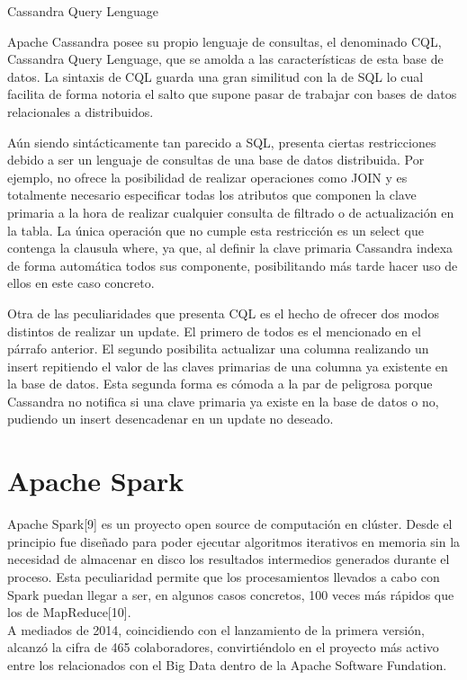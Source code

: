 Cassandra Query Lenguage

Apache Cassandra posee su propio lenguaje de consultas, el denominado CQL, Cassandra Query Lenguage, que se amolda a las características de esta base de datos. La sintaxis de CQL guarda una gran similitud con la de SQL lo cual facilita de forma notoria el salto que supone pasar de trabajar con bases de datos relacionales a distribuidos. 

Aún siendo sintácticamente  tan parecido a SQL, presenta ciertas restricciones debido a ser un lenguaje de consultas de una base de datos distribuida. Por ejemplo, no ofrece la posibilidad de realizar operaciones como JOIN y es totalmente necesario especificar todas los atributos que componen la clave primaria a la hora de realizar cualquier consulta de filtrado o de actualización en la tabla. La única operación que no cumple esta restricción es un select que contenga la clausula where, ya que, al definir la clave primaria Cassandra indexa de forma automática todos sus componente, posibilitando más tarde  hacer uso de ellos en este caso concreto.

Otra de las peculiaridades que presenta CQL es el hecho de ofrecer dos modos distintos de realizar un update. El primero de todos es el mencionado en el párrafo anterior. El segundo posibilita actualizar una columna realizando un insert repitiendo el valor de las claves primarias de una columna ya existente en la base de datos. Esta segunda forma es cómoda a la par de peligrosa porque Cassandra no notifica si una clave primaria ya existe en la base de datos o no, pudiendo un insert desencadenar en un update no deseado.  


\section{Apache Spark}

Apache Spark[9] es un proyecto open source de computación en clúster. Desde el principio fue diseñado para poder ejecutar algoritmos iterativos en memoria sin la necesidad de almacenar en disco los resultados intermedios generados durante el proceso. Esta peculiaridad permite que los procesamientos llevados a cabo con Spark puedan llegar a ser, en algunos casos concretos, 100 veces más rápidos que los de MapReduce[10].\\

A mediados de 2014, coincidiendo con el lanzamiento de la primera versión, alcanzó la cifra de 465 colaboradores, convirtiéndolo en el proyecto más activo entre los relacionados con el Big Data dentro de la Apache Software Fundation.\\

